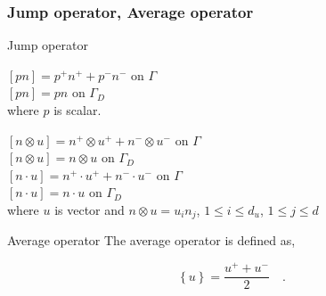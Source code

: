 \documentclass{beamer}
\begin{document}


\begin{frame}
\frametitle{Jump operator, Average operator}

\begin{block}{Jump operator}

\begin{center}
$[pn] = p^+ n^+ + p^- n^- $ on $\Gamma$\\
$[pn] = p n $ on $\Gamma_D$\\
where $p$ is scalar.
\end{center}

\begin{center}
$[n \otimes u] = n^+ \otimes u^+ + n^- \otimes u^-$ on $\Gamma$\\
$[n \otimes u] = n \otimes u$ on $\Gamma_D$\\
$[n \cdot u] = n^+ \cdot u^+ + n^- \cdot u^-$ on $\Gamma$\\
$[n \cdot u] = n \cdot u$ on $\Gamma_D$\\
where $u$ is vector and $n \otimes u = u_i n_j$, $1 \leq i \leq d_u$, $1 \leq j \leq d$\\ 
\end{center}
\end{block}

\begin{block}{Average operator}
The average operator is defined as,

\begin{equation}\label{average operator}
\left\lbrace u \right\rbrace = \frac{u^+ + u^-}{2}  \quad \textrm{.}
\end{equation} 

\end{block}

\end{frame}

\end{document}
